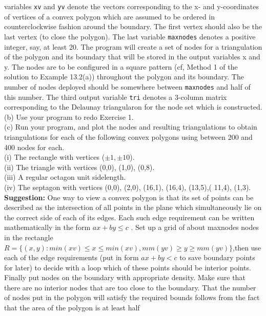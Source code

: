 \documentclass[../main.tex]{subfiles}
\begin{document}
\begin{enumerate}
variables \texttt{xv} and \texttt{yv} denote the vectors corresponding to the x- and y-coordinates of vertices of a 
convex polygon which are assumed to be ordered in counterclockwise fashion around the 
boundary. The first vertex should also be the last vertex (to close the polygon). The last 
variable \texttt{maxnodes} denotes a positive integer, say, at least 20. The program will create a set of 
nodes for a triangulation of the polygon and its boundary that will be stored in the output 
variables x and y. The nodes are to be configured in a square pattern (cf, Method 1 of the 
solution to Example 13.2(a)) throughout the polygon and its boundary. The number of nodes 
deployed should be somewhere between \texttt{maxnodes} and half of this number. The third output variable \texttt{tri} denotes a 3-column matrix corresponding to the Delaunay triangularon for the 
node set which is constructed.
\\ 
(b) Use your program to redo Exercise 1. 
\\
(c) Run your program, and plot the nodes and resulting triangulations to obtain triangulations for 
each of the following convex polygons using between 200 and 400 nodes for each. 
\\
(i) The rectangle with vertices ($\pm1,\pm10$).
\\ 
(ii) The triangle with vertices (0,0), (1,0), (0,8). \\
(iii) A regular octagon unit sidelength. 
\\
(iv) The septagon with vertices (0,0), (2,0), (16,1), (16,4), (13,5),( 11,4), (1,3). 
\\
\textbf{Suggestion:} One way to view a convex polygon is that its set of points can be described as the 
intersection of all points in the plane which simultaneously lie on the correct side of each of its 
edges. Each such edge requirement can be written mathematically in the form $ax + by \leqslant c$ . Set 
up a grid of about maxnodes nodes in the rectangle $R = \lbrace\left( x,y\right) : min(xv) \leqslant x \leqslant min(xv), 
mm(yv) \geqslant y \geqslant mm(yv)\rbrace$,then use each of the edge requirements (put in form $ax + by < c$ to 
save boundary points for later) to decide with a loop which of these points should be interior 
points. Finally put nodes on the boundary with appropriate density. Make sure that there are no 
interior nodes that are too close to the boundary. That the number of nodes put in the polygon 
will satisfy the required bounds follows from the fact that the area of the polygon is at least half 

\end{enumerate}
\end{document}
